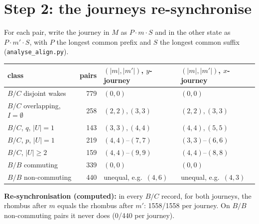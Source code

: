 \documentclass[11pt]{article}
\theoremstyle{definition}\newtheorem{definition}[theorem]{Definition}\newtheorem{remark}[theorem]{Remark}
\begin{document}
\section{Step 2: the journeys re-synchronise}
For each pair, write the journey in $M$ as $P\cdot m\cdot S$ and in the other state as $P\cdot m'\cdot S$, with $P$ the longest common prefix and $S$ the longest common suffix (\texttt{analyse\_align.py}).
\begin{center}\small\begin{tabular}{lrll}\toprule
class & pairs & $(|m|,|m'|)$, $y$-journey & $(|m|,|m'|)$, $x$-journey\\\midrule
$B/C$ disjoint wakes & 779 & $(0,0)$ & $(0,0)$\\
$B/C$ overlapping, $I=\emptyset$ & 258 & $(2,2),(3,3)$ & $(2,2),(3,3)$\\
$B/C$, $q$, $|U|=1$ & 143 & $(3,3),(4,4)$ & $(4,4),(5,5)$\\
$B/C$, $p$, $|U|=1$ & 219 & $(4,4)$--$(7,7)$ & $(3,3)$--$(6,6)$\\
$B/C$, $|U|\ge2$ & 159 & $(4,4)$--$(9,9)$ & $(4,4)$--$(8,8)$\\
$B/B$ commuting & 339 & $(0,0)$ & $(0,0)$\\
$B/B$ non-commuting & 440 & unequal, e.g.\ $(4,6)$ & unequal, e.g.\ $(4,3)$\\\bottomrule
\end{tabular}\end{center}
\textbf{Re-synchronisation (computed):} in every $B/C$ record, for both journeys, the rhombus after $m$ equals the rhombus after $m'$: 1558/1558 per journey.
On $B/B$ non-commuting pairs it never does (0/440 per journey).
\end{document}
